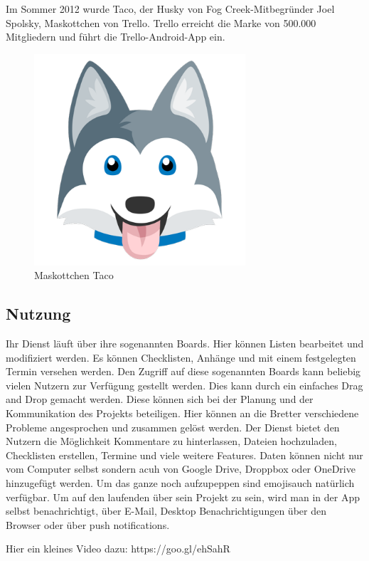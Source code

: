 Im Sommer 2012 wurde Taco, der Husky von Fog Creek-Mitbegründer Joel Spolsky, Maskottchen von Trello. Trello erreicht die Marke von 500.000 Mitgliedern und führt die Trello-Android-App ein.
\begin{figure}[h]
  \centering
    \includegraphics[width=0.7\textwidth]{taco.png}
  \caption{Maskottchen Taco}
  \label{fig:taco}
\end{figure}
\subsection{Nutzung}
Ihr Dienst läuft über ihre sogenannten Boards. Hier können Listen bearbeitet und modifiziert werden. Es können Checklisten, Anhänge und mit einem festgelegten Termin versehen werden. Den Zugriff auf diese sogenannten Boards kann beliebig vielen Nutzern zur Verfügung gestellt werden. Dies kann durch ein einfaches Drag and Drop gemacht werden. Diese können sich bei der Planung und der Kommunikation des Projekts beteiligen. Hier können an die Bretter verschiedene Probleme angesprochen und zusammen gelöst werden. Der Dienst bietet den Nutzern die Möglichkeit Kommentare zu hinterlassen, Dateien hochzuladen, Checklisten erstellen, Termine und viele weitere Features.
Daten können nicht nur vom Computer selbst sondern acuh von Google Drive, Droppbox oder OneDrive hinzugefügt werden. Um das ganze noch aufzupeppen sind \glqq emojis\grqq \space auch natürlich verfügbar. Um auf den laufenden über sein Projekt zu sein, wird man in der App selbst benachrichtigt, über E-Mail, Desktop Benachrichtigungen über den Browser oder über \glqq push notifications\grqq.

Hier ein kleines Video dazu: https://goo.gl/ehSahR

